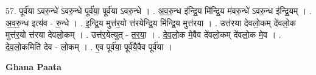 \documentclass[17pt]{extarticle}
\begin{document}
57. पूर्व॑या ऽवरु॒न्धे॑ ऽवरु॒न्धे पूर्व॑या॒ पूर्व॑या ऽवरु॒न्धे । . अ॒व॒रु॒न्ध इ॑न्द्रि॒य मि॑न्द्रि॒य म॑वरु॒न्धे॑ ऽवरु॒न्ध इ॑न्द्रि॒यम् । . अ॒व॒रु॒न्ध इत्य॑व - रु॒न्धे । . इ॒न्द्रि॒य मुत्त॑र॒यो त्त॑रयेन्द्रि॒य मि॑न्द्रि॒य मुत्त॑रया । . उत्त॑रया देवलो॒कम् दे॑वलो॒क मुत्त॑र॒यो त्त॑रया देवलो॒कम् । . उत्त॑र॒येत्युत् - त॒र॒या॒ । . दे॒व॒लो॒क मे॒वैव दे॑वलो॒कम् दे॑वलो॒क मे॒व । . दे॒व॒लो॒कमिति॑ देव - लो॒कम् । . ए॒व पूर्व॑या॒ पूर्व॑यै॒वैव पूर्व॑या । \newline

\textbf{Ghana Paata } \newline
\end{document}
